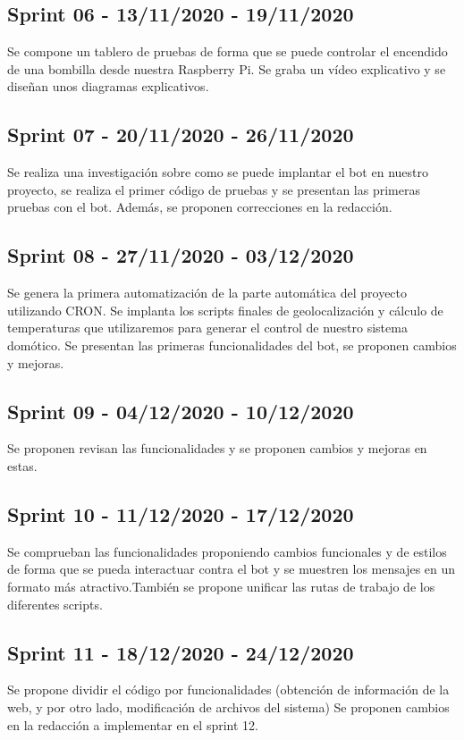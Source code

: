 \subsection{Sprint 06 - 13/11/2020 - 19/11/2020}
Se compone un tablero de pruebas de forma que se puede controlar el encendido de una bombilla desde nuestra Raspberry Pi. Se graba un vídeo explicativo y se diseñan unos diagramas explicativos.

\subsection{Sprint 07 - 20/11/2020 - 26/11/2020}
Se realiza una investigación sobre como se puede implantar el bot en nuestro proyecto, se realiza el primer código de pruebas y se presentan las primeras pruebas con el bot. Además, se proponen correcciones en la redacción.

\subsection{Sprint 08 - 27/11/2020 - 03/12/2020}
Se genera la primera automatización de la parte automática del proyecto utilizando CRON.
Se implanta los scripts finales de geolocalización y cálculo de temperaturas que utilizaremos para generar el control de nuestro sistema domótico.
Se presentan las primeras funcionalidades del bot, se proponen cambios y mejoras.

\subsection{Sprint 09 - 04/12/2020 - 10/12/2020}
Se proponen revisan las funcionalidades y se proponen cambios y mejoras en estas. 

\subsection{Sprint 10 - 11/12/2020 - 17/12/2020}
Se comprueban las funcionalidades proponiendo cambios funcionales y de estilos de forma que se pueda interactuar contra el bot y se muestren los mensajes en un formato más atractivo.También se propone unificar las rutas de trabajo de los diferentes scripts.

\subsection{Sprint 11 - 18/12/2020 - 24/12/2020}
Se propone dividir el código por funcionalidades (obtención de información de la web, y por otro lado, modificación de archivos del sistema)
Se proponen cambios en la redacción a implementar en el sprint 12.


